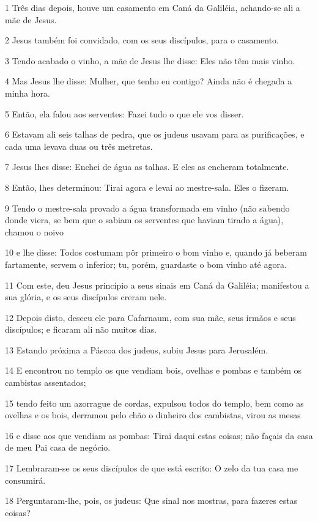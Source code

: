 \par 1 Três dias depois, houve um casamento em Caná da Galiléia, achando-se ali a mãe de Jesus.
\par 2 Jesus também foi convidado, com os seus discípulos, para o casamento.
\par 3 Tendo acabado o vinho, a mãe de Jesus lhe disse: Eles não têm mais vinho.
\par 4 Mas Jesus lhe disse: Mulher, que tenho eu contigo? Ainda não é chegada a minha hora.
\par 5 Então, ela falou aos serventes: Fazei tudo o que ele vos disser.
\par 6 Estavam ali seis talhas de pedra, que os judeus usavam para as purificações, e cada uma levava duas ou três metretas.
\par 7 Jesus lhes disse: Enchei de água as talhas. E eles as encheram totalmente.
\par 8 Então, lhes determinou: Tirai agora e levai ao mestre-sala. Eles o fizeram.
\par 9 Tendo o mestre-sala provado a água transformada em vinho (não sabendo donde viera, se bem que o sabiam os serventes que haviam tirado a água), chamou o noivo
\par 10 e lhe disse: Todos costumam pôr primeiro o bom vinho e, quando já beberam fartamente, servem o inferior; tu, porém, guardaste o bom vinho até agora.
\par 11 Com este, deu Jesus princípio a seus sinais em Caná da Galiléia; manifestou a sua glória, e os seus discípulos creram nele.
\par 12 Depois disto, desceu ele para Cafarnaum, com sua mãe, seus irmãos e seus discípulos; e ficaram ali não muitos dias.
\par 13 Estando próxima a Páscoa dos judeus, subiu Jesus para Jerusalém.
\par 14 E encontrou no templo os que vendiam bois, ovelhas e pombas e também os cambistas assentados;
\par 15 tendo feito um azorrague de cordas, expulsou todos do templo, bem como as ovelhas e os bois, derramou pelo chão o dinheiro dos cambistas, virou as mesas
\par 16 e disse aos que vendiam as pombas: Tirai daqui estas coisas; não façais da casa de meu Pai casa de negócio.
\par 17 Lembraram-se os seus discípulos de que está escrito: O zelo da tua casa me consumirá.
\par 18 Perguntaram-lhe, pois, os judeus: Que sinal nos mostras, para fazeres estas coisas?
